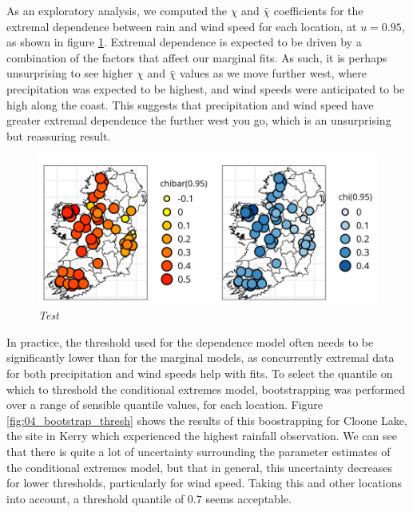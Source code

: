 \documentclass{article}
\numberwithin{equation}{section}
\begin{document}
As an exploratory analysis, we computed the $\chi$ and $\bar{\chi}$ coefficients for the extremal dependence between rain and wind speed for each location, at $u = 0.95$, as shown in figure \ref{fig:04_chi}.
Extremal dependence is expected to be driven by a combination of the factors that affect our marginal fits. 
As such, it is perhaps unsurprising to see higher $\chi$ and $\bar{\chi}$ values as we move further west, where precipitation was expected to be highest, and wind speeds were anticipated to be high along the coast. 
This suggests that precipitation and wind speed have greater extremal dependence the further west you go, which is an unsurprising but reassuring result.

\begin{figure}[H]
    \centering
    \includegraphics[width = 0.9\linewidth]{plots/041_chi_plots_crop.png}
    \caption{\emph{Test}}
    \label{fig:04_chi}
\end{figure}

In practice, the threshold used for the dependence model often needs to be significantly lower than for the marginal models, as concurrently extremal data for both precipitation and wind speeds help with fits. 
To select the quantile on which to threshold the conditional extremes model, bootstrapping was performed over a range of sensible quantile values, for each location. 
Figure \ref{fig:04_bootstrap_thresh} shows the results of this boostrapping for Cloone Lake, the site in Kerry which experienced the highest rainfall observation. 
We can see that there is quite a lot of uncertainty surrounding the parameter estimates of the conditional extremes model, but that in general, this uncertainty decreases for lower thresholds, particularly for wind speed. 
Taking this and other locations into account, a threshold quantile of $0.7$ seems acceptable.
\end{document}
